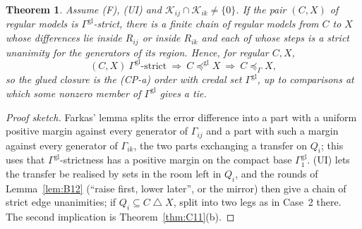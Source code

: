 \documentclass[11pt]{article}
\newtheorem{theorem}{Theorem}[section]
\theoremstyle{definition}
\theoremstyle{remark}
\newcommand{\sd}{\mathbin{\triangle}}
\begin{document}
\begin{theorem}\label{thm:C14}
Assume (F), (UI) and $\mathcal K_{ij}\cap\mathcal K_{ik}\ne\{0\}$. If the pair $(C,X)$ of regular models is $\Gamma^{\mathrm{gl}}$-strict, there is a finite chain of regular models from $C$ to $X$ whose differences lie inside $R_{ij}$ or inside $R_{ik}$ and each of whose steps is a strict unanimity for the generators of its region. Hence, for regular $C,X$,
\[
(C,X)\ \Gamma^{\mathrm{gl}}\text{-strict}\ \Longrightarrow\ C\preceq^{\mathrm{gl}}X\ \Longrightarrow\ C\preceq_\Gamma X ,
\]
so the glued closure is the (CP-a) order with credal set $\Gamma^{\mathrm{gl}}$, up to comparisons at which some nonzero member of $\Gamma^{\mathrm{gl}}$ gives a tie.
\end{theorem}
\begin{proof}[Proof sketch]
Farkas' lemma splits the error difference into a part with a uniform positive margin against every generator of $\Gamma_{ij}$ and a part with such a margin against every generator of $\Gamma_{ik}$, the two parts exchanging a transfer on $Q_i$; this uses that $\Gamma^{\mathrm{gl}}$-strictness has a positive margin on the compact base $\Gamma^{\mathrm{gl}}_1$. (UI) lets the transfer be realised by sets in the room left in $Q_i$, and the rounds of Lemma~\ref{lem:B12} (``raise first, lower later'', or the mirror) then give a chain of strict edge unanimities; if $Q_i\subseteq C\sd X$, split into two legs as in Case~2 there. The second implication is Theorem~\ref{thm:C11}(b).
\end{proof}
\end{document}
